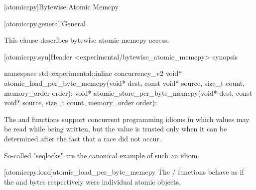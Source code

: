 
[atomiccpy]{Bytewise Atomic Memcpy}

[atomiccpy.general]{General}

This clause describes bytewise atomic memcpy access. 


[atomiccpy.syn]{Header <experimental/bytewise_atomic_memcpy> synopsis}

\begin{codeblock}
namespace std::experimental::inline concurrency_v2 {
  void* atomic_load_per_byte_memcpy(void* dest, const void* source, size_t count, memory_order order);
  void* atomic_store_per_byte_memcpy(void* dest, const void* source, size_t count, memory_order order);
}
\end{codeblock}

\pnum

The  and
 functions support concurrent
programming idioms in which values may be read while being written, but
the value is trusted only when it can be determined after the fact that
a race did not occur. \begin{note} So-called "seqlocks" are the canonical
example of such an idiom. \end{note}


[atomiccpy.load]{atomic_load_per_byte_memcpy}
\pnum
The  /
 functions behave as if the
 and  bytes respectively were individual
atomic objects.

\textbf{}

